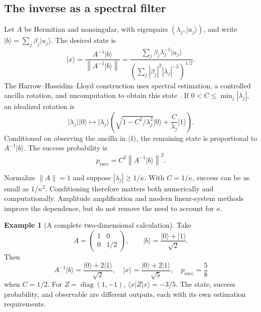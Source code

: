 \documentclass[11pt,a4paper]{article}
\newcommand{\ket}[1]{\lvert #1\rangle}
\newcommand{\bra}[1]{\langle #1\rvert}
\newcommand{\norm}[1]{\left\lVert #1\right\rVert}
\newcommand{\diag}{\operatorname{diag}}
\theoremstyle{definition}
\newtheorem{example}[theorem]{Example}
\theoremstyle{remark}
\numberwithin{equation}{section}
\begin{document}
\subsection{The inverse as a spectral filter}
Let $A$ be Hermitian and nonsingular, with eigenpairs $(\lambda_j,\ket{u_j})$,
and write $\ket{b}=\sum_j\beta_j\ket{u_j}$. The desired state is
\begin{equation}\label{eq:linearsolution}
 \ket{x}=\frac{A^{-1}\ket{b}}{\norm{A^{-1}\ket{b}}}
 =\frac{\sum_j\beta_j\lambda_j^{-1}\ket{u_j}}
 {\left(\sum_j|\beta_j|^2|\lambda_j|^{-2}\right)^{1/2}}.
\end{equation}
The Harrow--Hassidim--Lloyd construction uses spectral estimation,
a controlled ancilla rotation, and uncomputation to obtain this state
\citep{hhl2009}. If $0<C\leq\min_j|\lambda_j|$, an idealized rotation is
\begin{equation}
 \ket{\lambda_j}\ket{0}\longmapsto
 \ket{\lambda_j}\left(\sqrt{1-C^2/\lambda_j^2}\ket{0}+
 \frac{C}{\lambda_j}\ket{1}\right).
\end{equation}
Conditioned on observing the ancilla in $\ket{1}$, the remaining state is
proportional to $A^{-1}\ket{b}$. The success probability is
\begin{equation}\label{eq:hhlprob}
 p_{\mathrm{succ}}=C^2\norm{A^{-1}\ket{b}}^2.
\end{equation}

Normalize $\|A\|=1$ and suppose $|\lambda_j|\geq1/\kappa$.
With $C=1/\kappa$, success can be as small as $1/\kappa^2$.
Conditioning therefore matters both numerically and computationally.
Amplitude amplification and modern linear-system methods improve the
dependence, but do not remove the need to account for $\kappa$.

\begin{example}[A complete two-dimensional calculation]
Take
\begin{equation}
 A=\begin{pmatrix}1&0\\0&1/2\end{pmatrix},\qquad
 \ket{b}=\frac{\ket{0}+\ket{1}}{\sqrt2}.
\end{equation}
Then
\begin{equation}
 A^{-1}\ket{b}=\frac{\ket{0}+2\ket{1}}{\sqrt2},\quad
 \ket{x}=\frac{\ket{0}+2\ket{1}}{\sqrt5},\quad p_{\mathrm{succ}}=\frac58
\end{equation}
when $C=1/2$. For $Z=\diag(1,-1)$,
$\bra{x}Z\ket{x}=-3/5$. The state, success probability, and observable are
different outputs, each with its own estimation requirements.
\end{example}
\end{document}
